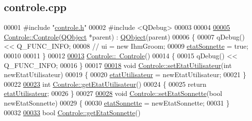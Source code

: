 \hypertarget{controle_8cpp_source}{}\subsection{controle.\+cpp}

\begin{DoxyCode}
00001 \textcolor{preprocessor}{#include "\hyperlink{controle_8h}{controle.h}"}
00002 \textcolor{preprocessor}{#include <QDebug>}
00003 
00004 
\hyperlink{class_controle_af64a33acc664bf02f2ea0b4f27f781e6}{00005} \hyperlink{class_controle_af64a33acc664bf02f2ea0b4f27f781e6}{Controle::Controle}(\hyperlink{class_q_object}{QObject} *parent) : \hyperlink{class_q_object}{QObject}(parent)
00006 \{
00007      qDebug() << Q\_FUNC\_INFO;
00008    \textcolor{comment}{//     ui = new IhmGroom;}
00009     \hyperlink{class_controle_afddf1dce812ff88577e308684b564f33}{etatSonnette} = \textcolor{keyword}{true};
00010 
00011 \}
00012 
\hyperlink{class_controle_a98f5d2630efbdb5f469cbb2675725b20}{00013} \hyperlink{class_controle_a98f5d2630efbdb5f469cbb2675725b20}{Controle::~Controle}()
00014 \{
00015     qDebug() << Q\_FUNC\_INFO;
00016 \}
00017 
\hyperlink{class_controle_a62db54114d126d03dd332332b3942320}{00018} \textcolor{keywordtype}{void} \hyperlink{class_controle_a62db54114d126d03dd332332b3942320}{Controle::setEtatUtilisateur}(\textcolor{keywordtype}{int} newEtatUtilisateur)
00019 \{
00020     \hyperlink{class_controle_a690595803de8f5c172b8bc46122ebb1a}{etatUtilisateur} = newEtatUtilisateur;
00021 \}
00022 
\hyperlink{class_controle_ac3bd8e8621cee56d4343e21a624e1c48}{00023} \textcolor{keywordtype}{int} \hyperlink{class_controle_ac3bd8e8621cee56d4343e21a624e1c48}{Controle::getEtatUtilisateur}()
00024 \{
00025     \textcolor{keywordflow}{return} \hyperlink{class_controle_a690595803de8f5c172b8bc46122ebb1a}{etatUtilisateur};
00026 \}
00027 
\hyperlink{class_controle_ac706c5e9ede46dab70631281b084e233}{00028} \textcolor{keywordtype}{void} \hyperlink{class_controle_ac706c5e9ede46dab70631281b084e233}{Controle::setEtatSonnette}(\textcolor{keywordtype}{bool} newEtatSonnette)
00029 \{
00030     \hyperlink{class_controle_afddf1dce812ff88577e308684b564f33}{etatSonnette} = newEtatSonnette;
00031 \}
00032 
\hyperlink{class_controle_acabf3768430c7f1acb268ca0fa1ddf99}{00033} \textcolor{keywordtype}{bool} \hyperlink{class_controle_acabf3768430c7f1acb268ca0fa1ddf99}{Controle::getEtatSonnette}()

\end{DoxyCode}
